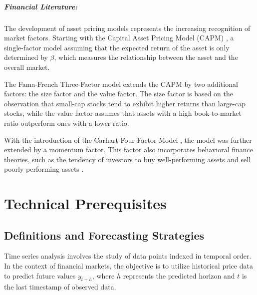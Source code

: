 \documentclass[12pt,twoside=false,a4paper,parskip]{scrbook}
\begin{document}
\paragraph{Financial Literature:}
The development of asset pricing models represents the increasing recognition of market factors. Starting with the Capital Asset Pricing Model (CAPM) \cite{https://doi.org/10.1111/j.1540-6261.1964.tb02865.x}, 
a single-factor model assuming that the expected return of the asset is only determined by $\beta$, which measures the relationship between the asset and the overall market.

The Fama-French Three-Factor model \cite{FAMA19933} extends the CAPM by two additional factors: the size factor and the value factor. 
The size factor is based on the observation that small-cap stocks tend to exhibit higher returns than large-cap stocks, 
while the value factor assumes that assets with a high book-to-market ratio outperform ones with a lower ratio.

With the introduction of the Carhart Four-Factor Model \cite{carhart_https://doi.org/10.1111/j.1540-6261.1997.tb03808.x}, 
the model was further extended by a momentum factor. This factor also incorporates behavioral finance theories, 
such as the tendency of investors to buy well-performing assets and sell poorly performing assets \cite{jegadeesh_https://doi.org/10.1111/j.1540-6261.1993.tb04702.x}.

\chapter{Technical Prerequisites}
\label{ch:technical_prerequisites}



\section{Definitions and Forecasting Strategies}
Time series analysis involves the study of data points indexed in temporal order. In the context of financial markets, the objective is to utilize historical price data to predict future values $y_{t+h}$, where $h$ represents the predicted horizon and $t$ is the last timestamp of observed data.
\end{document}
